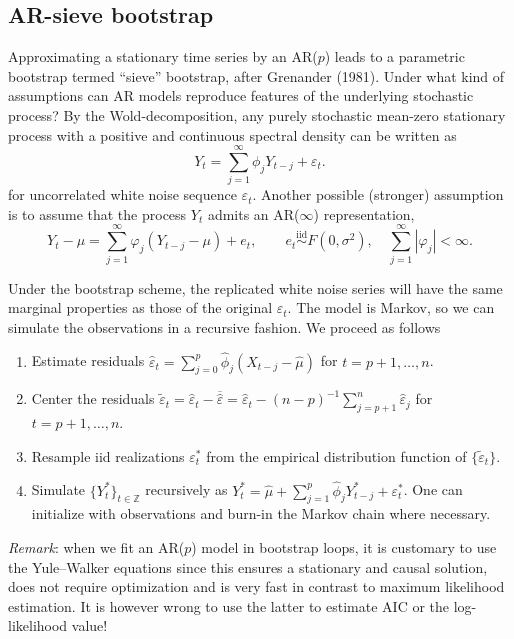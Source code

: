 \documentclass[]{book}
\providecommand{\tightlist}{%
  \setlength{\itemsep}{0pt}\setlength{\parskip}{0pt}}
\begin{document}
\hypertarget{ar-sieve-bootstrap}{%
\subsection{AR-sieve bootstrap}\label{ar-sieve-bootstrap}}

Approximating a stationary time series by an AR(\(p\)) leads to a parametric bootstrap termed ``sieve'' bootstrap, after Grenander (1981). Under what kind of assumptions can AR models reproduce features of the underlying stochastic process?
By the Wold-decomposition, any purely stochastic mean-zero stationary process with a positive and continuous spectral density can be written as
\[Y_t= \sum_{j=1}^\infty \phi_j Y_{t-j} + \varepsilon_t.\]
for uncorrelated white noise sequence \(\varepsilon_t\). Another possible (stronger) assumption is to assume that the process \(Y_t\) admits an AR(\(\infty\)) representation,
\[Y_t-\mu=\sum_{j=1}^\infty \varphi_j (Y_{t-j}-\mu) + e_t, \qquad e_t \stackrel{\mathrm{iid}}{\sim}F(0, \sigma^2), \quad \sum_{j=1}^\infty |\varphi_j| < \infty.\]

Under the bootstrap scheme, the replicated white noise series will have the same marginal properties as those of the original \(\varepsilon_t\). The model is Markov, so we can simulate the observations in a recursive fashion. We proceed as follows

\begin{enumerate}
\def\labelenumi{\arabic{enumi}.}
\tightlist
\item
  Estimate residuals \(\widehat{\varepsilon}_t = \sum_{j=0}^p \widehat{\phi}_j (X_{t-j}-\widehat{\mu})\) for \(t=p+1, \ldots, n\).
\item
  Center the residuals \(\widetilde{\varepsilon}_t=\widehat{\varepsilon}_t-\overline{\widehat{\varepsilon}} = \widehat{\varepsilon}_t - (n-p)^{-1} \sum_{j=p+1}^n \widehat{\varepsilon}_j\) for \(t=p+1, \ldots, n\).
\item
  Resample iid realizations \(\varepsilon^*_t\) from the empirical distribution function of \(\{\widetilde{\varepsilon}_t\}\).
\item
  Simulate \(\{Y_t^*\}_{t\in \mathbb{Z}}\) recursively as \(Y_t^*=\widehat{\mu}+\sum_{j=1}^p\widehat{\phi}_jY_{t-j}^*+\varepsilon^*_t\). One can initialize with observations and burn-in the Markov chain where necessary.
\end{enumerate}

\emph{Remark}: when we fit an AR(\(p\)) model in bootstrap loops, it is customary to use the Yule--Walker equations since this ensures a stationary and causal solution, does not require optimization and is very fast in contrast to maximum likelihood estimation. It is however wrong to use the latter to estimate AIC or the log-likelihood value!
\end{document}
